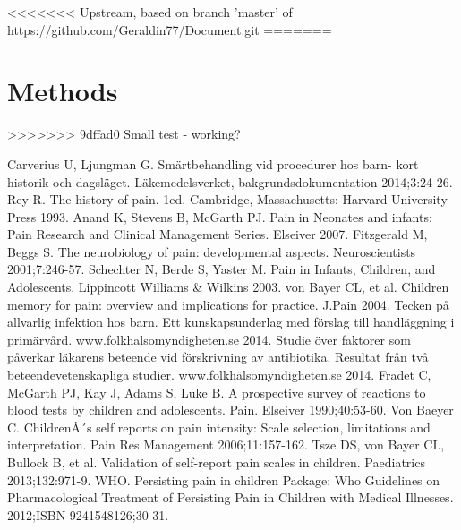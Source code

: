 \documentclass[12pt,twocolumn]{article}
\begin{document}
<<<<<<< Upstream, based on branch 'master' of https://github.com/Geraldin77/Document.git
=======
\section*{Methods}
>>>>>>> 9dffad0 Small test - working?


\newpage
\onecolumn

\begin{thebibliography}{1}
 Carverius U, Ljungman G. Sm\"artbehandling vid procedurer
hos barn- kort historik och dagsl\"aget. L\"akemedelsverket, bakgrundsdokumentation 2014;3:24-26. 
 Rey R. The history of pain. 1ed. Cambridge, Massachusetts:
Harvard University Press 1993.
Anand K, Stevens B, McGarth PJ. Pain in Neonates and infants:
Pain Research and Clinical Management Series. Elseiver 2007.
Fitzgerald M, Beggs S. The neurobiology of pain:
developmental aspects. Neuroscientists         2001;7:246-57.
 Schechter N, Berde S, Yaster M. Pain in Infants,
Children, and Adolescents. Lippincott Williams \& Wilkins 2003.
 von Bayer CL, et al. Children memory for pain: overview and implications for practice. J.Pain 2004.
 Tecken p\r{a} allvarlig infektion hos barn. Ett kunskapsunderlag med f\"orslag till handl\"aggning i prim\"arv\r{a}rd. www.folkhalsomyndigheten.se 2014.
 Studie \"over faktorer som p\r{a}verkar l\"akarens beteende vid f\"orskrivning av antibiotika. Resultat fr\r{a}n tv\r{a} beteendevetenskapliga studier. www.folkh\"alsomyndigheten.se 2014.
 Fradet C, McGarth PJ, Kay J, Adams S, Luke B. A prospective survey of reactions to blood        tests by children and adolescents. Pain. Elseiver 1990;40:53-60.
 Von Baeyer C.    ChildrenÂ´s self reports on pain intensity: Scale selection, limitations and            interpretation. Pain Res Management 2006;11:157-162.
 Tsze DS, von Bayer CL, Bullock B, et al. Validation of self-report pain scales in children.     Paediatrics 2013;132:971-9.
 WHO. Persisting pain in children Package: Who Guidelines on Pharmacological Treatment   of Persisting Pain in Children with Medical Illnesses. 2012;ISBN 9241548126;30-31.

\end{thebibliography}
\end{document}
